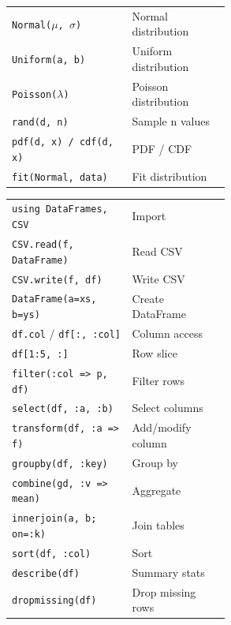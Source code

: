 \documentclass[10pt]{extarticle}
\begin{document}
\begin{multicols}{2}
\begin{tabularx}{\linewidth}{@{}>{\raggedright\arraybackslash}p{0.55\linewidth}@{\enspace}Y@{}}
\texttt{Normal($\mu$, $\sigma$)}   & Normal distribution \\
\texttt{Uniform(a, b)}              & Uniform distribution \\
\texttt{Poisson($\lambda$)}        & Poisson distribution \\
\texttt{rand(d, n)}                  & Sample n values \\
\texttt{pdf(d, x) / cdf(d, x)}    & PDF / CDF \\
\texttt{fit(Normal, data)}          & Fit distribution \\
\end{tabularx}

\begin{tabularx}{\linewidth}{@{}>{\raggedright\arraybackslash}p{0.55\linewidth}@{\enspace}Y@{}}
\texttt{using DataFrames, CSV}       & Import \\
\texttt{CSV.read(f, DataFrame)}     & Read CSV \\
\texttt{CSV.write(f, df)}           & Write CSV \\
\texttt{DataFrame(a=xs, b=ys)}     & Create DataFrame \\
\texttt{df.col} / \texttt{df[:, :col]}  & Column access \\
\texttt{df[1:5, :]}                 & Row slice \\
\texttt{filter(:col => p, df)}     & Filter rows \\
\texttt{select(df, :a, :b)}        & Select columns \\
\texttt{transform(df, :a => f)}    & Add/modify column \\
\texttt{groupby(df, :key)}         & Group by \\
\texttt{combine(gd, :v => mean)}   & Aggregate \\
\texttt{innerjoin(a, b; on=:k)}    & Join tables \\
\texttt{sort(df, :col)}            & Sort \\
\texttt{describe(df)}              & Summary stats \\
\texttt{dropmissing(df)}           & Drop missing rows \\
\end{tabularx}


\end{multicols}
\end{document}
